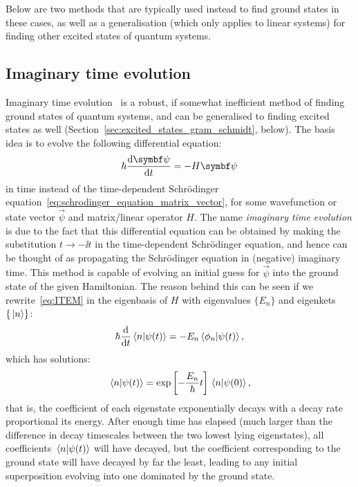 Below are two methods that are typically used instead to find ground states in these cases, as well as a generalisation (which only applies to linear systems) for finding other excited states of quantum systems.

\subsection{Imaginary time evolution}\label{sec:ITEM}

Imaginary time evolution~\cite{lehtovaara_solution_2007} is a robust, if somewhat inefficient method of finding ground states of quantum systems, and can be generalised to finding excited states as well (Section~\ref{sec:excited_states_gram_schmidt}, below). The basis idea is to evolve the following differential equation:
\begin{align}\label{eq:ITEM}
\hbar\dv{\vec\psi}{t} = - H \vec \psi
\end{align}
in time instead of the time-dependent Schr\"odinger equation~\eqref{eq:schrodinger_equation_matrix_vector}, for some wavefunction or state vector $\vec \psi$ and matrix/linear operator $H$. The name \emph{imaginary time evolution} is due to the fact that this differential equation can be obtained by making the substitution $t\rightarrow - \ii t$ in the time-dependent Schr\"odinger equation, and hence can be thought of as propagating the Schr\"odinger equation in (negative) imaginary time. This method is capable of evolving an initial guess for $\vec \psi$
into the ground state of the given Hamiltonian. The reason behind this can be seen if we rewrite~\eqref{eq:ITEM} in the eigenbasis of $H$ with eigenvalues $\{E_n\}$ and eigenkets $\{\ket{n}\}$:
\begin{align}
\hbar \dv t \braket{n}{\psi(t)} = - E_n \braket{\phi_n}{\psi(t)},
\end{align}
which has solutions:
\begin{align}
\braket{n}{\psi(t)} = \exp\left[- \frac{E_n}\hbar t\right]\braket{n}{\psi(0)},
\end{align}
that is, the coefficient of each eigenstate exponentially decays with a decay rate proportional its energy. After enough time has elapsed (much larger than the difference in decay timescales between the two lowest lying eigenstates), all coefficients $\braket{n}{\psi(t)}$ will have decayed, but the coefficient corresponding to the ground state will have decayed by far the least, leading to any initial superposition evolving into one dominated by the ground state.

